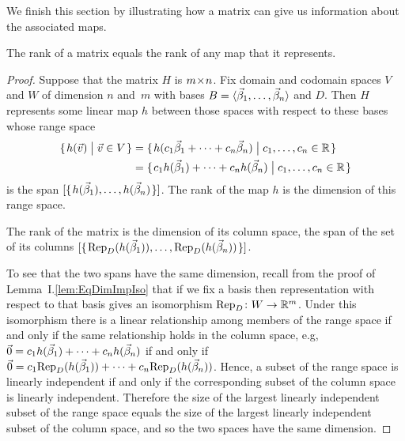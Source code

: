 We finish this section by illustrating how a matrix can 
give us information
about the associated maps.

\begin{theorem} \label{th:RankMatEqRankMap}
The rank of a matrix equals the rank of any map that it represents.
\end{theorem}

\begin{proof}
Suppose that the matrix \( H \) is \( \nbym{m}{n} \). 
Fix domain and codomain spaces $V$ and $W$ of dimension $n$ and~$m$ with
bases \( B=\sequence{\vec{\beta}_1,\dots,\vec{\beta}_n} \) and \( D \).
Then \( H \) represents some linear map $h$ between those spaces with respect 
to these bases whose range space
\begin{align*}
  \set{h(\vec{v})\suchthat \vec{v}\in V}
  &=\set{h(c_1\vec{\beta}_1+\dots+c_n\vec{\beta}_n)  
           \suchthat c_1,\dots,c_n\in\Re}                    \\
  &=\set{c_1h(\vec{\beta}_1)+\dots+c_nh(\vec{\beta}_n)
            \suchthat c_1,\dots,c_n\in\Re}
\end{align*}
is the span $\spanof{\set{h(\vec{\beta}_1),\dots,h(\vec{\beta}_n)}}$.
The rank of the map $h$ is the dimension of this range space.

The rank of the matrix is the dimension of its column space,
the span of the set of its columns
$\spanof{\set{\rep{h(\vec{\beta}_1)}{D},\dots,\rep{h(\vec{\beta}_n)}{D}}}$.

To see that the two spans have the same dimension, recall 
from the proof of Lemma~I.\ref{lem:EqDimImpIso} that if we fix a basis then
representation with respect to that basis gives an isomorphism 
$\map{\mbox{Rep}_D}{W}{\Re^m}$.
Under this isomorphism there is a linear relationship among members of the
range space if and only if the same relationship holds in the
column space, e.g,
$\zero=c_1h(\vec{\beta}_1)+\dots+c_nh(\vec{\beta}_n)$ if and only if
$\zero=c_1\rep{h(\vec{\beta}_1)}{D}+\dots+c_n\rep{h(\vec{\beta}_n)}{D}$.
Hence, a subset of the range space is linearly independent if and only if the
corresponding subset of the column space is linearly independent.
Therefore the size of the largest linearly independent subset of the
range space equals the size of the largest linearly independent subset of the
column space, and so the two spaces have the same dimension.
\end{proof}

